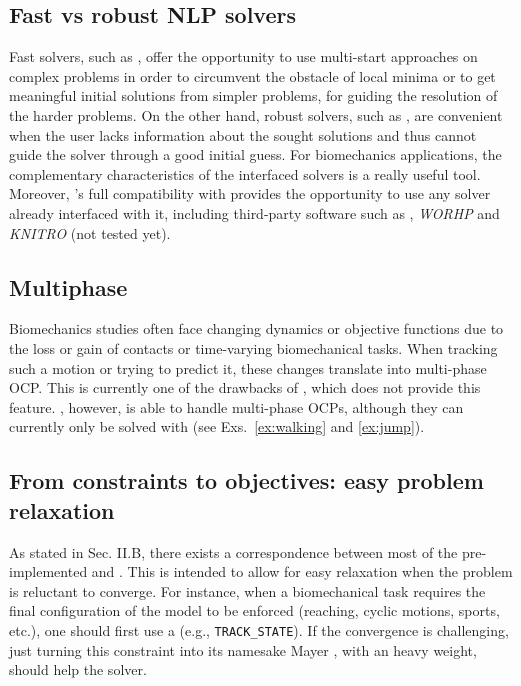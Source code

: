 \subsection{Fast vs robust NLP solvers}

Fast solvers, such as \acados, offer the opportunity to use multi-start approaches on complex problems in order to circumvent the obstacle of local minima \cite{huchez2015local, bailly2020optimal} or to get meaningful initial solutions from simpler problems, for guiding the resolution of the harder problems.
On the other hand, robust solvers, such as \ipopt, are convenient when the user lacks information about the sought solutions and thus cannot guide the solver through a good initial guess.
For biomechanics applications, the complementary characteristics of the interfaced solvers is a really useful tool.
Moreover, \bioptim's full compatibility with \casadi provides the opportunity to use any solver already interfaced with it, including third-party software such as \snopt, \textit{WORHP} and \textit{KNITRO} (not tested yet). 

\subsection{Multiphase}

Biomechanics studies often face changing dynamics or objective functions due to the loss or gain of contacts or time-varying biomechanical tasks.
When tracking such a motion or trying to predict it, these changes translate into multi-phase OCP.
This is currently one of the drawbacks of \moco, which does not provide this feature.
\bioptim, however, is able to handle multi-phase OCPs, although they can currently only be solved with \ipopt (see Exs.~\ref{ex:walking} and \ref{ex:jump}).


\subsection{From constraints to objectives: easy problem relaxation}

As stated in Sec. II.B, there exists a correspondence between most of the pre-implemented \constraints and \objectives.
This is intended to allow for easy relaxation when the problem is reluctant to converge. 
For instance, when a biomechanical task requires the final configuration of the model to be enforced (reaching, cyclic motions, sports, etc.), one should first use a \constraint (e.g., \texttt{TRACK\_STATE}).
If the convergence is challenging, just turning this constraint into its namesake Mayer \objective, with an heavy weight, should help the solver.

